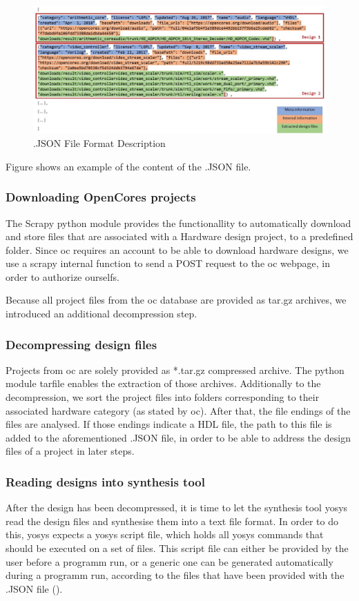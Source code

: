 \begin{figure}[tb]
	\centering
	\includegraphics{fig/jsonFileFormatDescription.JPG}
	\caption{.JSON File Format Description}
	\label{fig:jsonFormat}
\end{figure}

Figure  shows an example of the content of the .JSON file. 

\subsubsection{Downloading OpenCores projects}
The Scrapy python module provides the functionallity to automatically download and
store files that are associated with a Hardware design project, to a predefined
folder. Since \gls{oc} requires an account to be able to download hardware designs, 
we use a scrapy internal function to send a POST request to the \gls{oc} webpage,
in order to authorize ourselfs. 

Because all project files from the \gls{oc} database are provided as tar.gz archives,
we introduced an additional decompression step.  

\subsubsection{Decompressing design files} 
Projects from \gls{oc} are solely provided as *.tar.gz compressed archive. The \gls{python}
module tarfile enables the extraction of those archives. Additionally 
to the decompression, we sort the project files into folders corresponding to 
their associated hardware category (as stated by \gls{oc}). After that, the file 
endings of the files are analysed. If those endings indicate a \gls{HDL} file, the path 
to this file is added to the aforementioned .JSON file, in order to be able to
address the design files of a project in later steps.

\subsubsection{Reading designs into synthesis tool} 
After the design has been decompressed, it is time to let the synthesis tool 
yosys read the design files and synthesise them into a text file format. In 
order to do this, yosys expects a yosys script file, which holds all yosys commands 
that should be executed on a set of files. This script file can either be provided
by the user before a programm run, or a generic one can be generated automatically 
during a programm run, according to the files that have been provided with the 
.JSON file (). 

